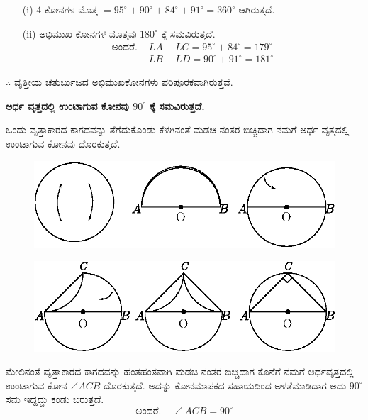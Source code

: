  \eject
 
 \begin{itemize}
 \item[(i)] 4 ಕೋನಗಳ ಮೊತ್ತ $= 95^\circ + 90^\circ + 84^\circ + 91^\circ =360^\circ $ ಆಗಿರುತ್ತದೆ. 
 
 \item[(ii)] ಅಭಿಮುಖ ಕೋನಗಳ ಮೊತ್ತವು  $180^\circ$ ಕ್ಕೆ  ಸಮವಿರುತ್ತದೆ. 
 \begin{align*}
 \text{ಅಂದರೆ. } & LA + LC = 95^\circ + 84^\circ = 179^\circ \\
 & LB + LD = 90^\circ + 91^\circ = 181^\circ
 \end{align*}
 \end{itemize}
 
 $\therefore$ ವೃತ್ತೀಯ ಚತುರ್ಬುಜದ ಅಭಿಮುಖಕೋನಗಳು ಪರಿಪೂರಕವಾಗಿರುತ್ತವೆ. 
 
 \medskip
 \noindent
 \textbf{ಅರ್ಧ ವೃತ್ತದಲ್ಲಿ ಉಂಟಾಗುವ ಕೋನವು  $90^\circ$ ಕ್ಕೆ ಸಮವಿರುತ್ತದೆ.}
 
 ಒಂದು ವೃತ್ತಾಕಾರದ ಕಾಗದವನ್ನು ತೆಗೆದುಕೊಂಡು ಕೆಳಗಿನಂತೆ ಮಡಚಿ ನಂತರ ಬಿಚ್ಚಿದಾಗ ನಮಗೆ ಅರ್ಧ ವೃತ್ತದಲ್ಲಿ ಉಂಟಾಗುವ ಕೋನವು ದೊರಕುತ್ತದೆ. 
 \begin{figure}[H]
\centering
\includegraphics[scale=.8]{src/figure/chap1/fig1-33a.eps}
\end{figure}
\begin{figure}[H]
\centering
\includegraphics[scale=.8]{src/figure/chap1/fig1-33b.eps}
\end{figure}
 
 ಮೇಲಿನಂತೆ ವೃತ್ತಾಕಾರದ ಕಾಗದವನ್ನು ಹಂತಹಂತವಾಗಿ ಮಡಚಿ ನಂತರ ಬಿಚ್ಚಿದಾಗ ಕೊನೆಗೆ ನಮಗೆ ಅರ್ಧವೃತ್ತದಲ್ಲಿ ಉಂಟಾಗುವ ಕೋನ $\angle ACB$ ದೊರಕುತ್ತದೆ. ಅದನ್ನು ಕೋನಮಾಪಕದ ಸಹಾಯದಿಂದ ಅಳತೆಮಾಡಿದಾಗ ಅದು  $90^\circ$ ಸಮ ಇದ್ದದ್ದು ಕಂಡು ಬರುತ್ತದೆ. 
 $$
 \text{ಅಂದರೆ. } \quad  \angle ~ AC B = 90^\circ
 $$
 
